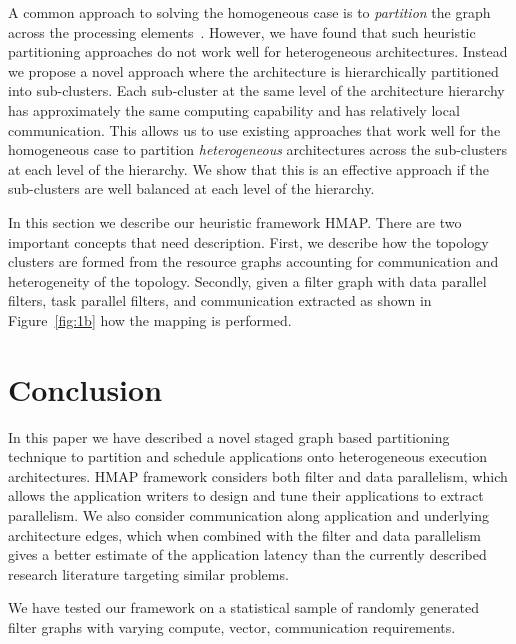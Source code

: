 \documentclass[10pt, conference, compsocconf]{IEEEtran}
\begin{document}
A common approach to solving the homogeneous case is to
\textit{partition} the graph across the processing
elements~\cite{aale01,kpur99,enys98}.  However, we have found that such
heuristic partitioning approaches do not work well for heterogeneous
architectures. Instead we propose a novel approach where the
architecture is hierarchically partitioned into sub-clusters.  Each
sub-cluster at the same level of the architecture hierarchy has
approximately the same computing capability and has relatively local
communication. This allows us to use existing approaches that work well
for the homogeneous case to partition \textit{heterogeneous}
architectures across the sub-clusters at each level of the hierarchy. We
show that this is an effective approach if the sub-clusters are well
balanced at each level of the hierarchy.

In this section we describe our heuristic framework HMAP. There are two
important concepts that need description. First, we describe how the
topology clusters are formed from the resource graphs accounting for
communication and heterogeneity of the topology. Secondly, given a
filter graph with data parallel filters, task parallel filters, and
communication extracted as shown in Figure~\ref{fig:1b} how the mapping
is performed.

%



% 





\section{Conclusion}
\label{sec:conclusion}

In this paper we have described a novel staged graph based partitioning
technique to partition and schedule applications onto heterogeneous
execution architectures. HMAP framework considers both filter and data
parallelism, which allows the application writers to design and tune their
applications to extract parallelism. We also consider communication along
application and underlying architecture edges, which when combined with the
filter and data parallelism gives a better estimate of the application latency
than the currently described research literature targeting similar problems.

We have tested our framework on a statistical sample of randomly
generated filter graphs with varying compute, vector, communication
requirements.
\end{document}

